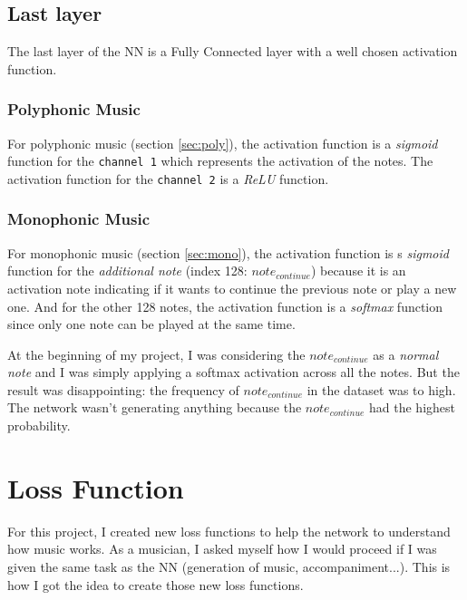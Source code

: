 \documentclass[12pt]{report}
\begin{document}
\subsection{Last layer}

The last layer of the NN is a Fully Connected layer with a well chosen activation function.

\subsubsection{Polyphonic Music}

For polyphonic music (section \ref{sec:poly}), the activation function is a \textit{sigmoid} function for the \texttt{channel 1} which represents the activation of the notes.
The activation function for the \texttt{channel 2} is a \textit{ReLU} function.

\subsubsection{Monophonic Music}
\label{sec:last-layer-mono}

For monophonic music (section \ref{sec:mono}), the activation function is s \textit{sigmoid} function for the \textit{additional note} (index 128: $note_{continue}$) because it is an activation note indicating if it wants to continue the previous note or play a new one. And for the other 128 notes, the activation function is a \textit{softmax} function since only one note can be played at the same time.

At the beginning of my project, I was considering the $note_{continue}$ as a \textit{normal note} and I was simply applying a softmax activation across all the notes.
But the result was disappointing: the frequency of $note_{continue}$ in the dataset was to high.
The network wasn't generating anything because the $note_{continue}$ had the highest probability.


\section{Loss Function}
\label{sec:loss}

For this project, I created new loss functions to help the network to understand how music works.
As a musician, I asked myself how I would proceed if I was given the same task as the NN (generation of music, accompaniment...).
This is how I got the idea to create those new loss functions.
\end{document}

